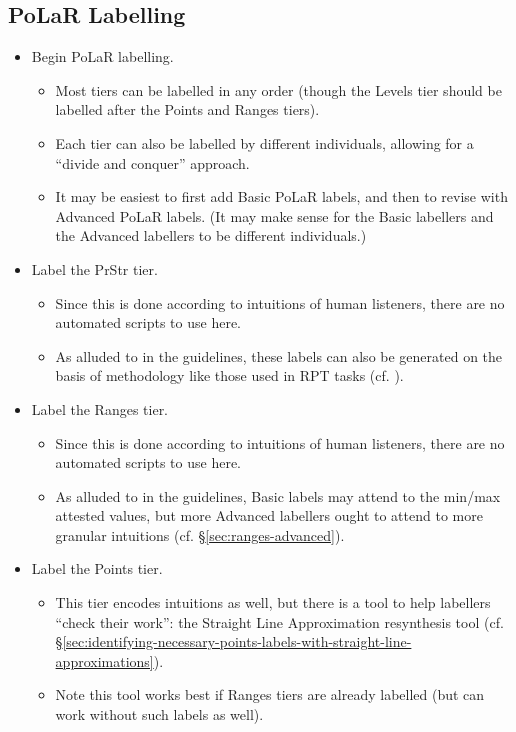 \subsection{PoLaR Labelling}	
	\begin{itemize}
		\item Begin PoLaR labelling.
		\begin{itemize}
			\item Most tiers can be labelled in any order (though the Levels tier should be labelled after the Points and Ranges tiers).
			\item Each tier can also be labelled by different individuals, allowing for a “divide and conquer” approach.
			\item It may be easiest to first add Basic PoLaR labels, and then to revise with Advanced PoLaR labels. (It may make sense for the Basic labellers and the Advanced labellers to be different individuals.)
		\end{itemize}
		\item Label the PrStr tier.
		\begin{itemize}
			\item Since this is done according to intuitions of human listeners, there are no automated scripts to use here.
			\item As alluded to in the guidelines, these labels can also be generated on the basis of methodology like those used in RPT tasks (cf. \citealt{cole-14, cole-17}).
		\end{itemize}
		\item Label the Ranges tier.
		\begin{itemize}
			\item Since this is done according to intuitions of human listeners, there are no automated scripts to use here.
			\item As alluded to in the guidelines, Basic labels may attend to the min\slash max attested values, but more Advanced labellers ought to attend to more granular intuitions (cf. §\ref{sec:ranges-advanced}).
		\end{itemize}
		\item Label the Points tier.
		\begin{itemize}
			\item This tier encodes intuitions as well, but there is a tool to help labellers “check their work”:  the Straight Line Approximation resynthesis tool (cf. §\ref{sec:identifying-necessary-points-labels-with-straight-line-approximations}).
			\item Note this tool works best if Ranges tiers are already labelled (but can work without such labels as well).

\end{itemize}
\end{itemize}

